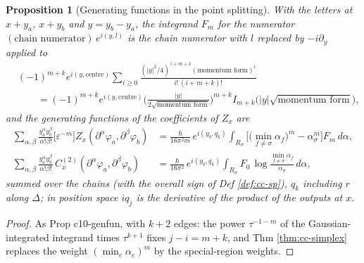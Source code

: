 \documentclass[11pt]{article}
\numberwithin{equation}{section}
\theoremstyle{plain}
\newtheorem{proposition}[theorem]{Proposition}
\theoremstyle{definition}
\begin{document}
\begin{proposition}[Generating functions in the point splitting]
\label{prop:cc-genfun}
With the letters at $x+y_a$, $x+y_b$ and $y=y_b-y_a$, the integrand $F_m$ for the numerator $(\text{chain numerator})\,e^{i(y,l)}$ is the chain numerator with $l$ replaced by $-i\partial_y$ applied to
\[
\begin{aligned}
&(-1)^{m+k}e^{i(y,\text{centre})}\sum_{i\ge0}\frac{(|y|^2/4)^{\,i+m+k}(\text{momentum form})^i}{i!\,(i+m+k)!}\\
&\qquad=(-1)^{m+k}e^{i(y,\text{centre})}\Big(\frac{|y|}{2\sqrt{\text{momentum form}}}\Big)^{m+k}I_{m+k}\big(|y|\sqrt{\text{momentum form}}\big),
\end{aligned}
\]
and the generating functions of the coefficients of $Z_x$ are
\[
\begin{aligned}
\sum_{\alpha,\beta}\frac{y_a^\alpha y_b^\beta}{\alpha!\beta!}\big[\varepsilon^{-m}\big]Z_x(\partial^\alpha\varphi_a,\partial^\beta\varphi_b)&=\frac{\hbar}{16\pi^2m}\,e^{i(y_b,q_k)}\int_{R_\sigma}\Big[\big(\min_{f\ne\sigma}\alpha_f\big)^m-\alpha_\sigma^m\Big]F_m\,d\alpha,\\
\sum_{\alpha,\beta}\frac{y_a^\alpha y_b^\beta}{\alpha!\beta!}\,C^{(2)}_x(\partial^\alpha\varphi_a,\partial^\beta\varphi_b)&=\frac{\hbar}{16\pi^2}\,e^{i(y_b,q_k)}\int_{R_\sigma}F_0\,\log\frac{\min_{f\ne\sigma}\alpha_f}{\alpha_\sigma}\,d\alpha,
\end{aligned}
\]
summed over the chains (with the overall sign of Def \ref{def:cc-sp}), $q_k$ including $r$ along $\Delta$; in position space $iq_j$ is the derivative of the product of the outputs at $x$.
\end{proposition}

\begin{proof}
As Prop c10-genfun, with $k+2$ edges: the power $\tau^{-1-m}$ of the Gaussian-integrated integrand times $\tau^{k+1}$ fixes $j-i=m+k$, and Thm \ref{thm:cc-simplex} replaces the weight $(\min_e\alpha_e)^m$ by the special-region weights.
\end{proof}
\end{document}
